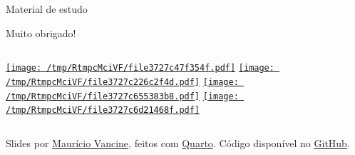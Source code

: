 \documentclass[
  ignorenonframetext,
]{beamer}
\begin{document}
\begin{frame}{Material de estudo}
\begin{block}{Muito obrigado!}
\begin{columns}[T]
\begin{column}{0.5\textwidth}
\href{https://mauriciovancine.github.io/}{\protect\texttt{[image: /tmp/RtmpcMciVF/file3727c47f354f.pdf]}}
\href{mailto:mauricio.vancine@gmail.com}{\protect\texttt{[image: /tmp/RtmpcMciVF/file3727c226c2f4d.pdf]}}
\href{https://twitter.com/mauriciovancine}{\protect\texttt{[image: /tmp/RtmpcMciVF/file3727c655383b8.pdf]}}
\href{https://github.com/mauriciovancine}{\protect\texttt{[image: /tmp/RtmpcMciVF/file3727c6d21468f.pdf]}}
\end{column}
\end{columns}

Slides por \href{https://mauriciovancine.github.io/}{Maurício Vancine},
feitos com \href{https://quarto.org/}{Quarto}. Código disponível no
\href{https://github.com/mauriciovancine/workshop-r-introduction/blob/master/01_slides/slides.qmd}{GitHub}.
\end{block}
\end{frame}
\end{document}
